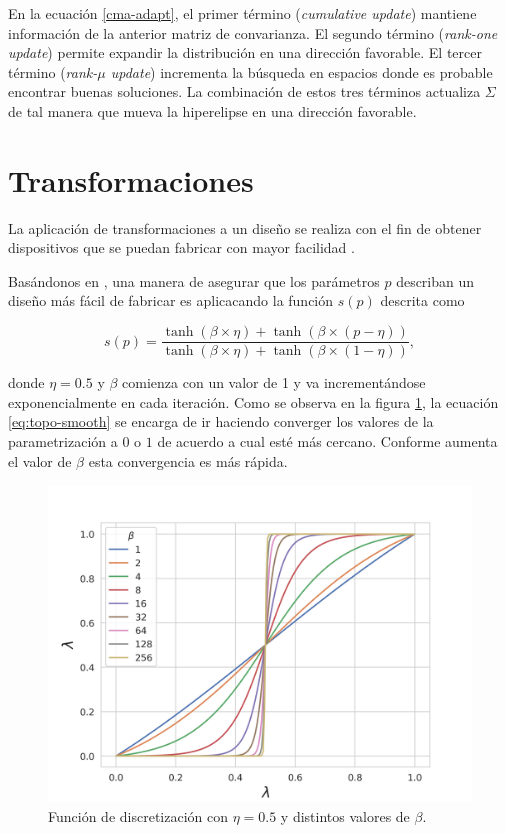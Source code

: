 En la ecuación \ref{cma-adapt}, el primer término (\emph{cumulative update}) 
mantiene información de la anterior matriz de convarianza.
El segundo término (\emph{rank-one update}) permite expandir la distribución en
una dirección favorable.
El tercer término (\emph{rank-$\mu$ update}) incrementa la búsqueda en espacios
donde es probable encontrar buenas soluciones.
La combinación de estos tres términos actualiza $\Sigma$ de tal manera que
mueva la hiperelipse en una dirección favorable.

\section{Transformaciones}\label{sec:transformations}

La aplicación de transformaciones a un diseño se realiza con el fin de obtener
dispositivos que se puedan fabricar con mayor facilidad \citep{Su2020}. 

Basándonos en \cite{Zhang2021}, una manera de asegurar que los
parámetros $p$ describan un diseño más fácil de fabricar es aplicacando la función $s(p)$
descrita como

\begin{equation}
  s(p) = \frac{\tanh (\beta \times \eta) + \tanh (\beta \times (p
  - \eta))}{\tanh (\beta \times \eta) + \tanh (\beta \times (1 - \eta))},
  \label{eq:topo-smooth}
\end{equation}

    donde $\eta = 0.5$ y $\beta$ comienza con un valor de 1 y va incrementándose exponencialmente en cada iteración. 
    Como se observa en la figura \ref{fig:discretization}, la ecuación \ref{eq:topo-smooth} se encarga de ir haciendo converger los valores de la parametrización a $0$ o $1$ de acuerdo a cual esté más cercano. 
    Conforme aumenta el valor de $\beta$ esta convergencia es más rápida.

    \begin{figure}[ht]
      \centering
      \includegraphics[scale=0.8]{image/theory/discretization.png}
      \caption{Función de discretización con $\eta = 0.5$ y distintos valores
      de $\beta$.}
      \label{fig:discretization}
    \end{figure}

